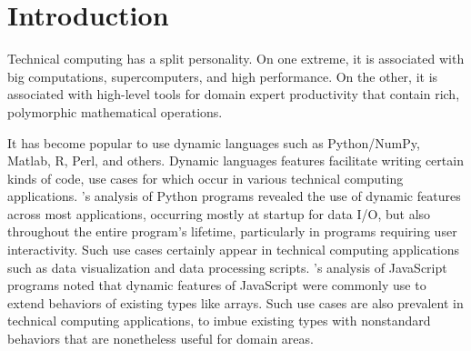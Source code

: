 \section{Introduction}
Technical computing has a split personality. On one extreme, it is associated with big computations, supercomputers, and high performance. On the other, it is associated with high-level tools for domain expert productivity that contain rich, polymorphic mathematical operations.

It has become popular to use dynamic languages such as Python/NumPy, Matlab, R, Perl, and others.
Dynamic languages features facilitate writing certain kinds of code, use cases
for which occur in various technical computing applications.
\cite{Holkner2009}'s analysis of Python programs revealed the use of dynamic
features across most applications, occurring mostly at startup for data I/O, but
also throughout the entire program's lifetime, particularly in programs
requiring user interactivity. Such use cases certainly appear in technical
computing applications such as data visualization and data processing scripts.
\cite{Richards2010}'s analysis of JavaScript programs noted that dynamic
features of JavaScript were commonly use to extend behaviors of existing types
like arrays. Such use cases are also prevalent in technical computing
applications, to imbue existing types with nonstandard behaviors that are
nonetheless useful for domain areas.

